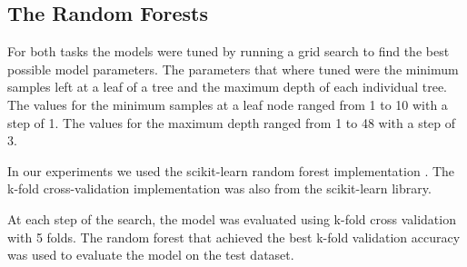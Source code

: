 \subsection{The Random Forests}

For both tasks the models were tuned by running a grid search to find the best possible model parameters. The parameters that where tuned were the minimum samples left at a leaf of a tree and the maximum depth of each individual tree. The values for the minimum samples at a leaf node ranged from 1 to 10 with a step of 1. The values for the maximum depth ranged from 1 to 48 with a step of 3.

In our experiments we used the scikit-learn random forest implementation \cite{sklearn}. The k-fold cross-validation implementation was also from the scikit-learn library.

At each step of the search, the model was evaluated using k-fold cross validation with 5 folds. The random forest that achieved the best k-fold validation accuracy was used to evaluate the model on the test dataset.


